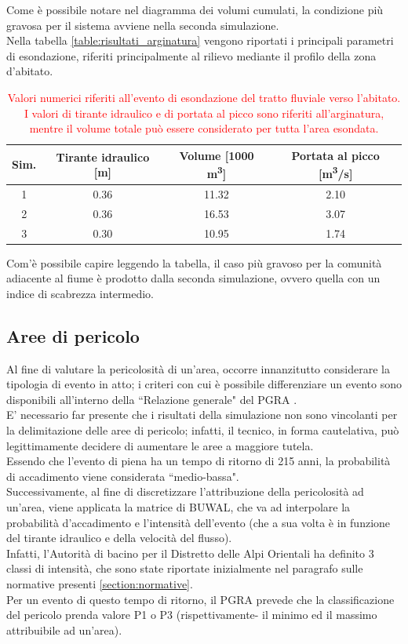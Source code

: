 Come è possibile notare nel diagramma dei volumi cumulati, la condizione più gravosa per il sistema avviene nella seconda simulazione.\\
Nella tabella \eqref{table:risultati_arginatura} vengono riportati i principali parametri di esondazione, riferiti principalmente al rilievo mediante il profilo della zona d'abitato.
\begin{table}[hbt]\centering
    \caption{\textcolor{red}{Valori numerici riferiti all'evento di esondazione del tratto fluviale verso l'abitato. I valori di tirante idraulico e di portata al picco sono riferiti all'arginatura, mentre il volume totale può essere considerato per tutta l'area esondata.}}
    \begin{tabular}{cccc}
    \toprule
    Sim. & Tirante idraulico [m] & Volume [1000 \unit{m^3}] & Portata al picco [\unit{m^3/s}] \\
    \midrule
    1 & 0.36 & 11.32 &   2.10\\
    2 & 0.36 & 16.53 & 3.07  \\
    3 & 0.30 & 10.95 & 1.74  \\
    \bottomrule
    \end{tabular}
    \label{table:risultati_arginatura}
    \end{table}

Com'è possibile capire leggendo la tabella, il caso più gravoso per la comunità adiacente al fiume è prodotto dalla seconda simulazione, ovvero quella con un indice di scabrezza intermedio.

\subsection{Aree di pericolo}
Al fine di valutare la pericolosità di un'area, occorre innanzitutto considerare la tipologia di evento in atto; i criteri con cui è possibile differenziare un evento sono disponibili all'interno della ``Relazione generale" del PGRA \cite{rel_gen_pgra}.\\
E' necessario far presente che i risultati della simulazione non sono vincolanti per la delimitazione delle aree di pericolo; infatti, il tecnico, in forma cautelativa, può legittimamente decidere di aumentare le aree a maggiore tutela.\\
Essendo che l'evento di piena ha un tempo di ritorno di 215 anni, la probabilità di accadimento viene considerata ``medio-bassa".\\
Successivamente, al fine di discretizzare l'attribuzione della pericolosità ad un'area, viene applicata la matrice di BUWAL, che va ad interpolare la probabilità d'accadimento e l'intensità dell'evento (che a sua volta è in funzione del tirante idraulico e della velocità del flusso).\\
Infatti, l'Autorità di bacino per il Distretto delle Alpi Orientali ha definito 3 classi di intensità, che sono state riportate inizialmente nel paragrafo sulle normative presenti \eqref{section:normative}.\\
Per un evento di questo tempo di ritorno, il PGRA prevede che la classificazione del pericolo prenda valore P1 o P3 (rispettivamente- il minimo ed il massimo attribuibile ad un'area).\\

